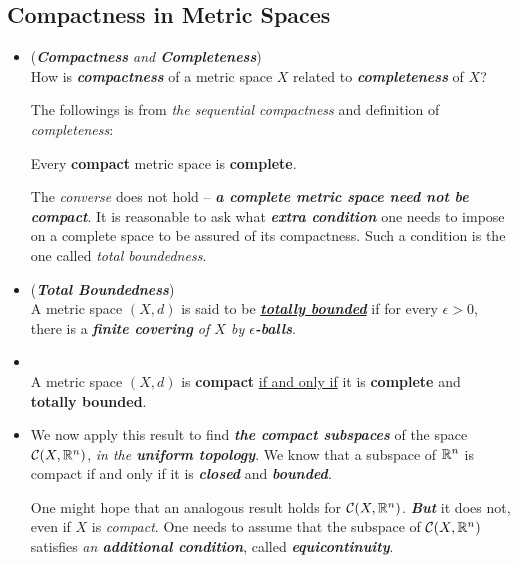 \documentclass[11pt]{article}
\begin{document}
\subsection{Compactness in Metric Spaces}
\begin{itemize}
\item \begin{remark} (\emph{\textbf{Compactness} and \textbf{Completeness}})\\
How is \emph{\textbf{compactness}} of a metric space $X$ related to \emph{\textbf{completeness}} of $X$? 

The followings is from \emph{the sequential compactness} and definition of \emph{completeness}:
\begin{proposition}
Every \textbf{compact} metric space is \textbf{complete}.
\end{proposition}
The \emph{converse} does not hold -- \emph{\textbf{a complete metric space need not be compact}}. It is reasonable to ask what \emph{\textbf{extra condition}} one needs to impose on a complete space to be assured of its compactness.
Such a condition is the one called \emph{total boundedness}.
\end{remark}

\item \begin{definition} (\emph{\textbf{Total Boundedness}})\\
A metric space $(X, d)$ is said to be \underline{\emph{\textbf{totally bounded}}} if for every $\epsilon > 0$, there is a \emph{\textbf{finite covering} of $X$ by \textbf{$\epsilon$-balls}}.
\end{definition}

\item \begin{theorem} \citep{munkres2000topology}\\
A metric space $(X, d)$ is \textbf{compact} \underline{if and only if} it is \textbf{complete} and \textbf{totally bounded}.
\end{theorem}

\item \begin{remark}
We now apply this result to find \emph{\textbf{the compact subspaces}} of the space ${\mathcal C}(X, {\mathbb R}^n)$, \emph{in the \textbf{uniform topology}}. We know that a subspace of ${\mathbb R}^n$ is compact if and only if it is \emph{\textbf{closed}} and \emph{\textbf{bounded}}. 

One might hope that an analogous result holds for ${\mathcal C}(X, {\mathbb R}^n)$. \emph{\textbf{But}} it does not, even if $X$ is \emph{compact}. One needs to assume that the subspace of ${\mathcal C}(X, {\mathbb R}^n)$ satisfies \emph{an \textbf{additional condition}}, called \emph{\textbf{equicontinuity}}. 
\end{remark}


\end{itemize}
\end{document}
